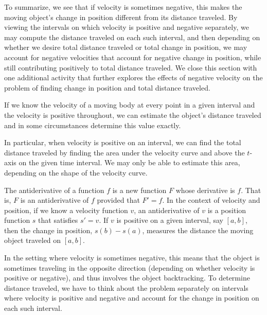 To summarize, we see that if velocity is sometimes negative, this makes the moving object's change in position different from its distance traveled.  By viewing the intervals on which velocity is positive and negative separately, we may compute the distance traveled on each such interval, and then depending on whether we desire total distance traveled or total change in position, we may account for negative velocities that account for negative change in position, while still contributing positively to total distance traveled.  We close this section with one additional activity that further explores the effects of negative velocity on the problem of finding change in position and total distance traveled.


\clearpage

\begin{summary}
\item If we know the velocity of a moving body at every point in a given interval and the velocity is positive throughout, we can estimate the object's distance traveled and in some circumstances determine this value exactly.

\item In particular, when velocity is positive on an interval, we can find the total distance traveled by finding the area under the velocity curve and above the $t$-axis on the given time interval.  We may only be able to estimate this area, depending on the shape of the velocity curve.

\item The antiderivative of a function $f$ is a new function $F$ whose derivative is $f$.  That is, $F$ is an antiderivative of $f$ provided that $F' = f$.  In the context of velocity and position, if we know a velocity function $v$, an antiderivative of $v$ is a position function $s$ that satisfies $s' = v$.  If $v$ is positive on a given interval, say $[a,b]$, then the change in position, $s(b) - s(a)$, measures the distance the moving object traveled on $[a,b]$.

\item In the setting where velocity is sometimes negative, this means that the object is sometimes traveling in the opposite direction (depending on whether velocity is positive or negative), and thus involves the object backtracking.  To determine distance traveled, we have to think about the problem separately on intervals where velocity is positive and negative and account for the change in position on each such interval.
\end{summary}

\clearpage

 

\cleardoublepage